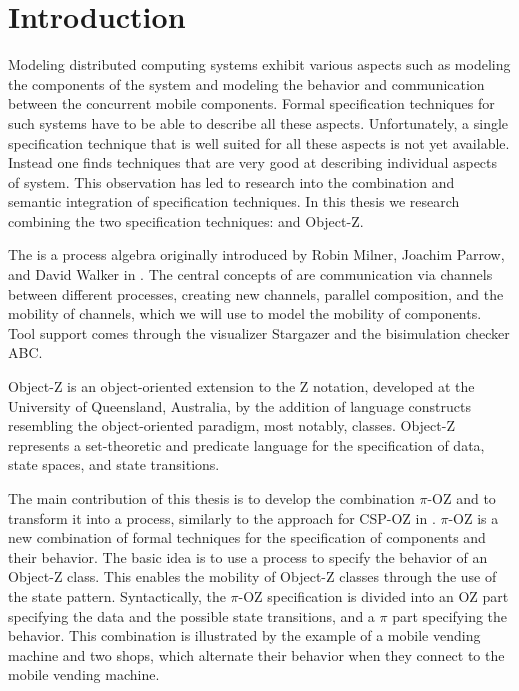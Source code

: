 \chapter{Introduction}
\pagestyle{scrheadings}	
\setcounter{page}{0}
\label{chp_introduction}
Modeling distributed computing systems exhibit various aspects such as modeling the components of the system and modeling the behavior and communication between the concurrent mobile components. Formal specification techniques for such systems have to be able to describe all these aspects. Unfortunately, a single specification technique that is well suited for all these aspects is not yet available. Instead one finds techniques that are very good at describing individual aspects of system. This observation has led to research into the combination and semantic integration of specification techniques. In this thesis we research combining the two specification techniques:
\picalc{} and Object-Z.

The \picalc{} is a process algebra originally introduced by Robin Milner, Joachim Parrow, and David Walker in \cite{milner1992calculus}. The central concepts of \picalc{} are communication via channels between different processes, creating new channels, parallel composition, and the mobility of channels, which we will use to model the mobility of components. Tool support comes through the \picalc{} visualizer Stargazer and the bisimulation checker ABC.

Object-Z is an object-oriented extension to the Z notation, developed at the University of Queensland, Australia, by the addition of language constructs resembling the object-oriented paradigm, most notably, classes. Object-Z represents a set-theoretic and predicate language for the specification of data, state spaces, and state transitions.

The main contribution of this thesis is to develop the combination $\pi$-OZ and to transform it into a \picalc{} process, similarly to the approach for CSP-OZ in \cite{olderog}. $\pi$-OZ is a new combination of formal techniques for the specification of components and their behavior. The basic idea is to use a \picalc{} process to specify the behavior of an Object-Z class. This enables the mobility of Object-Z classes through the use of the state pattern. Syntactically, the $\pi$-OZ specification is divided into an OZ part specifying the data and the possible state transitions, and a $\pi$ part specifying the behavior.  This combination is illustrated by the example of a mobile vending machine and two shops, which alternate their behavior when they connect to the mobile vending machine.

